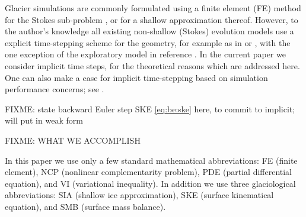 \documentclass[hidelinks,onefignum,onetabnum,final]{siamart220329}  %
\begin{document}
Glacier simulations are commonly formulated using a finite element (FE) method for the Stokes sub-problem \cite{IsaacStadlerGhattas2015,Jouvetetal2008,Pattynetal2008}, or for a shallow approximation thereof.  However, to the author's knowledge all existing non-shallow (Stokes) evolution models use a explicit time-stepping scheme for the geometry, for example as in \cite{Jouvetetal2008} or \cite{LofgrenAhlkronaHelanow2022}, with the one exception of the exploratory model in reference \cite{WirbelJarosch2020}.  In the current paper we consider implicit time steps, for the theoretical reasons which are addressed here.  One can also make a case for implicit time-stepping based on simulation performance concerns; see \cite{Bueler2023}.

FIXME: state backward Euler step SKE \eqref{eq:be:ske} here, to commit to implicit; will put in weak form

FIXME: WHAT WE ACCOMPLISH

In this paper we use only a few standard mathematical abbreviations: FE (finite element), NCP (nonlinear complementarity problem), PDE (partial differential equation), and VI (variational inequality).  In addition we use three glaciological abbreviations: SIA (shallow ice approximation), SKE (surface kinematical equation), and SMB (surface mass balance).
\end{document}
